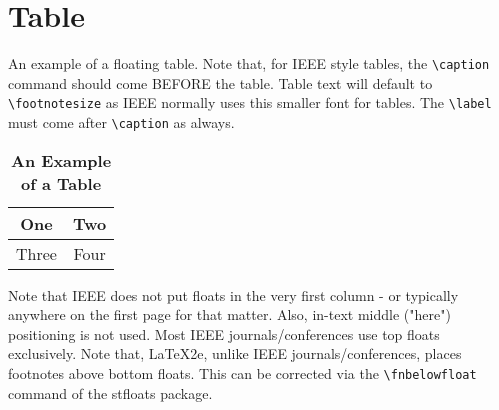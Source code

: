 \section{Table}
An example of a floating table. Note that, for IEEE style tables, the 
\verb|\caption| command should come BEFORE the table. Table text will default to
\verb|\footnotesize| as IEEE normally uses this smaller font for tables.
The \verb|\label| must come after \verb|\caption| as always.

\begin{table}
\caption{\textbf{\label{tab:1} An Example of a Table}}
\begin{tabular}{cc}
\hline
One & Two\\
\hline
Three & Four\\
\hline
\end{tabular}
\end{table}


Note that IEEE does not put floats in the very first column - or typically
anywhere on the first page for that matter. Also, in-text middle ("here")
positioning is not used. Most IEEE journals/conferences use top floats
exclusively. Note that, LaTeX2e, unlike IEEE journals/conferences, places
footnotes above bottom floats. This can be corrected via the \verb|\fnbelowfloat|
command of the stfloats package.

